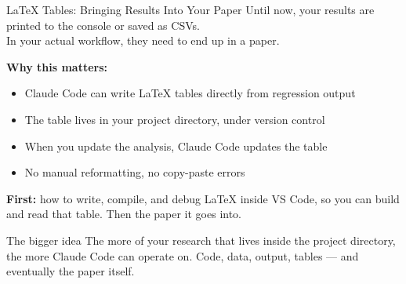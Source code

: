 \documentclass[aspectratio=169, 11pt]{beamer}
\begin{document}

\begin{frame}{\LaTeX{} Tables: Bringing Results Into Your Paper}
  Until now, your results are printed to the console or saved as CSVs.\\
  In your actual workflow, they need to end up in a paper.

  \vspace{0.8em}
  \textbf{Why this matters:}
  \begin{itemize}
    \item Claude Code can write \LaTeX{} tables directly from regression output
    \item The table lives in your project directory, under version control
    \item When you update the analysis, Claude Code updates the table
    \item No manual reformatting, no copy-paste errors
  \end{itemize}

  \vspace{0.8em}
  \textbf{First:} how to write, compile, and debug \LaTeX{} inside VS Code, so you can build and read that table. Then the paper it goes into.

  \vspace{0.5em}
  \begin{block}{The bigger idea}
    The more of your research that lives inside the project directory, the more Claude Code
    can operate on. Code, data, output, tables --- and eventually the paper itself.
  \end{block}
\end{frame}
\end{document}
